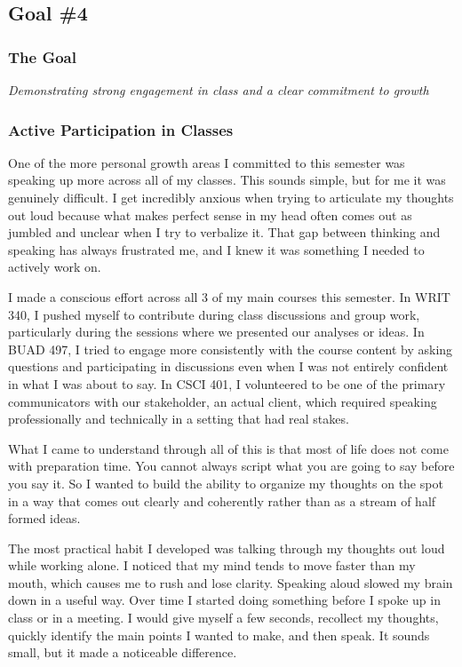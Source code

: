 \documentclass[12pt]{article}
\begin{document}
        \newpage
        \subsection{Goal \#4}

            \subsubsection*{The Goal}
            \textit{Demonstrating strong engagement in class and a clear commitment to growth}

            \subsubsection{Active Participation in Classes}

            One of the more personal growth areas I committed to this semester was speaking up more across all of my classes. This sounds simple, but for me it was genuinely difficult. I get incredibly anxious when trying to articulate my thoughts out loud because what makes perfect sense in my head often comes out as jumbled and unclear when I try to verbalize it. That gap between thinking and speaking has always frustrated me, and I knew it was something I needed to actively work on.

            I made a conscious effort across all 3 of my main courses this semester. In WRIT 340, I pushed myself to contribute during class discussions and group work, particularly during the sessions where we presented our analyses or ideas. In BUAD 497, I tried to engage more consistently with the course content by asking questions and participating in discussions even when I was not entirely confident in what I was about to say. In CSCI 401, I volunteered to be one of the primary communicators with our stakeholder, an actual client, which required speaking professionally and technically in a setting that had real stakes.

            What I came to understand through all of this is that most of life does not come with preparation time. You cannot always script what you are going to say before you say it. So I wanted to build the ability to organize my thoughts on the spot in a way that comes out clearly and coherently rather than as a stream of half formed ideas.

            The most practical habit I developed was talking through my thoughts out loud while working alone. I noticed that my mind tends to move faster than my mouth, which causes me to rush and lose clarity. Speaking aloud slowed my brain down in a useful way. Over time I started doing something before I spoke up in class or in a meeting. I would give myself a few seconds, recollect my thoughts, quickly identify the main points I wanted to make, and then speak. It sounds small, but it made a noticeable difference.
\end{document}
